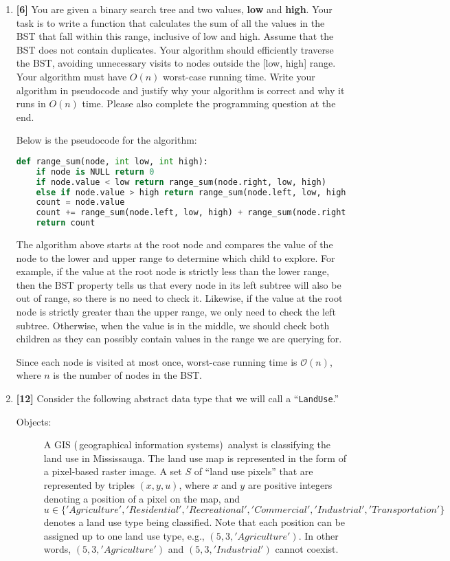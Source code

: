 \documentclass{assignment-263}
\begin{document}
\think
\begin{enumerate}
\item \textbf{[6]}
    You are given a binary search tree and two values, \textbf{low} and \textbf{high}. Your task 
    is to write a function that calculates the sum of all the values in the BST that fall within this
    range, inclusive of low and high. Assume that the BST does not contain duplicates. Your 
    algorithm should efficiently traverse the BST, avoiding unnecessary visits to nodes outside
    the [low, high] range. 
    Your algorithm must have $O(n)$ worst-case running time.
    Write your algorithm in pseudocode and justify why your algorithm is correct and why it runs 
    in $O(n)$ time. Please also complete the programming question at the end.

	Below is the pseudocode for the algorithm:
	\begin{lstlisting}[language=Python]
def range_sum(node, int low, int high):
	if node is NULL return 0
	if node.value < low return range_sum(node.right, low, high)
	else if node.value > high return range_sum(node.left, low, high)
	count = node.value
	count += range_sum(node.left, low, high) + range_sum(node.right, low, high)
	return count
	\end{lstlisting}
	The algorithm above starts at the root node and compares the value of the node to the lower and upper range to determine which child to explore. For example, if the value at the root node is strictly less than the lower range, then the BST property tells us that every node in its left subtree will also be out of range, so there is no need to check it. Likewise, if the value at the root node is strictly greater than the upper range, we only need to check the left subtree. Otherwise, when the value is in the middle,  we should check both children as they can possibly contain values in the range we are querying for.

	Since each node is visited at most once, worst-case running time is \(\mathcal{O} (n)\), where \(n\) is the number of nodes in the BST.

\item \textbf{[12]}
    Consider the following abstract data type that we will call a
		``\texttt{LandUse}.''
		\begin{description}
		\item[Objects:]
				A GIS (\,geographical information systems)\, analyst is 
				classifying the land use in Mississauga.
				The land use map is represented in the form of a  
				pixel-based raster image. 
				A set $S$ of ``land use pixels'' that are represented by
				triples $(x, y, u)$, where $x$ and $y$ are positive
				integers denoting a position of a pixel on the map, and
				$u\in\{'Agriculture', 'Residential', 'Recreational',
				'Commercial', 'Industrial', 'Transportation'\}$ denotes 
				a land use type being classified. Note that each position
				can be assigned up to one land use type, e.g., 
				$(5, 3, 'Agriculture')$. In other words, $(5, 3, 'Agriculture')$ 
				and $(5, 3, 'Industrial')$ cannot coexist. 


\end{description}
\end{enumerate}
\end{document}
